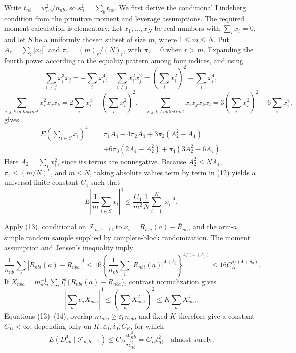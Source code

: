 Write \(t_{nb}=w_{nb}^2/n_{nb}\), so \(s_n^2=\sum_bt_{nb}\). We first derive the conditional Lindeberg condition from the primitive moment and leverage assumptions. The required moment calculation is elementary. Let \(x_1,\ldots,x_N\) be real numbers with \(\sum_i x_i=0\), and let \(S\) be a uniformly chosen subset of size \(m\), where \(1\le m\le N\). Put \(A_r=\sum_i|x_i|^r\) and \(\pi_r=(m)_r/(N)_r\), with \(\pi_r=0\) when \(r>m\). Expanding the fourth power according to the equality pattern among four indices, and using
\[
\sum_{i\ne j}x_i^3x_j=-\sum_i x_i^4,
\quad
\sum_{i\ne j}x_i^2x_j^2=\left(\sum_i x_i^2\right)^2-\sum_i x_i^4,
\]
\[
\sum_{i,j,k\ {
m distinct}}x_i^2x_jx_k
=2\sum_i x_i^4-\left(\sum_i x_i^2\right)^2,
\quad
\sum_{i,j,k,l\ {
m distinct}}x_ix_jx_kx_l
=3\left(\sum_i x_i^2\right)^2-6\sum_i x_i^4,
\]
gives
\[
\begin{aligned}
E\left(\sum_{i\in S}x_i\right)^4
={}&\pi_1A_4-4\pi_2A_4
+3\pi_2(A_2^2-A_4)\\
&+6\pi_3(2A_4-A_2^2)
+\pi_4(3A_2^2-6A_4).
\end{aligned}
\tag{12}
\]
Here \(A_2=\sum_i x_i^2\), since its terms are nonnegative. Because \(A_2^2\le NA_4\), \(\pi_r\le(m/N)^r\), and \(m\le N\), taking absolute values term by term in (12) yields a universal finite constant \(C_4\) such that
\[
E\left|\frac1m\sum_{i\in S}x_i\right|^4
\le\frac{C_4}{m^2}\frac1N\sum_{i=1}^N|x_i|^4.
\tag{13}
\]

Apply (13), conditional on \(\mathcal F_{n,b-1}\), to
\(x_i=R_{nbi}(a)-\bar R_{nba}\) and the arm-\(a\) simple random sample supplied by complete-block randomization. The moment assumption and Jensen's inequality imply
\[
\frac1{n_{nb}}\sum_i|R_{nbi}(a)-\bar R_{nba}|^4
\le16\left\{\frac1{n_{nb}}\sum_i|R_{nbi}(a)|^{4+\delta_0}\right\}^{4/(4+\delta_0)}
\le16C_R^{4/(4+\delta_0)}.
\tag{14}
\]
If \(X_{nba}=m_{nba}^{-1}\sum_iI_i^a\{R_{nbi}(a)-\bar R_{nba}\}\), contrast normalization gives
\[
\left|\sum_ac_aX_{nba}\right|^4
\le\left(\sum_aX_{nba}^2\right)^2
\le K\sum_aX_{nba}^4.
\]
Equations (13)--(14), overlap \(m_{nba}\ge\varepsilon_0n_{nb}\), and fixed \(K\) therefore give a constant \(C_D<\infty\), depending only on \(K,\varepsilon_0,\delta_0,C_R\), for which
\[
E(D_{nb}^4\mid\mathcal F_{n,b-1})
\le C_D\frac{w_{nb}^4}{n_{nb}^2}=C_Dt_{nb}^2
\quad\text{almost surely.}
\tag{15}
\]

